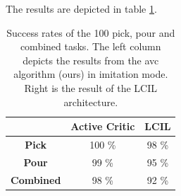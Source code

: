 The results are depicted in table \ref{tab:lcil}.

\begin{table}
    \centering
    \begin{tabular}{|c|c|c|}
        \cline{2-3}
        \multicolumn{1}{c|}{} & \textbf{Active Critic} & \textbf{LCIL} \\ \hline
        \textbf{Pick} & 100 \% & 98 \% \\ \hline
        \textbf{Pour} & 99 \% & 95 \% \\ \hline
        \textbf{Combined} & 98 \% & 92 \% \\ \hline
    \end{tabular}
    \caption{Success rates of the 100 pick, pour and combined tasks. The left column depicts the results from the \ac{avc} algorithm (ours) in 
    imitation mode. Right is the result of the LCIL architecture.}
    \label{tab:lcil}
\end{table}

